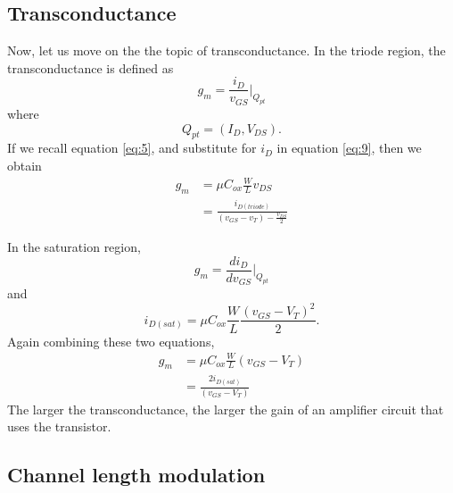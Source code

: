 \documentclass[nobib]{tufte-handout}
\begin{document}
\subsection{Transconductance}

Now, let us move on the the topic of transconductance. 
In the triode region, the transconductance is defined as 
\begin{equation} \label{eq:9}
    g_m = \frac{i_D}{v_{GS}} \rvert_{Q_{pt}}
\end{equation}
where 
\begin{equation}
    Q_{pt} = (I_D, V_{DS}).
\end{equation}
If we recall equation \ref{eq:5}, and substitute
for $i_D$ in equation \ref{eq:9}, then we obtain 
\begin{align}
    g_m &= \mu C_{ox} \frac{W}{L} v_{DS} \\
    &= \frac{i_{D(triode)}}{(v_{GS}-v_T)-\frac{v_{DS}}{2}}
\end{align}

In the saturation region, 
\begin{equation} \label{eq:10}
    g_m = \frac{di_D}{dv_{GS}} \rvert_{Q_{pt}}
\end{equation}
and 
\begin{equation} \label{eq:11}
    i_{D(sat)} = \mu C_{ox} \frac{W}{L} \frac{(v_{GS}-V_T)^2}{2}.
\end{equation}
Again combining these two equations, 
\begin{align} \label{eq:12}
    g_m &= \mu C_{ox} \frac{W}{L}(v_{GS} - V_T) \\
    &= \frac{2i_{D(sat)}}{(v_{GS}-V_T)}
\end{align}
The larger the transconductance, the larger 
the gain of an amplifier circuit 
that uses the transistor. 

\subsection{Channel length modulation}
\end{document}
